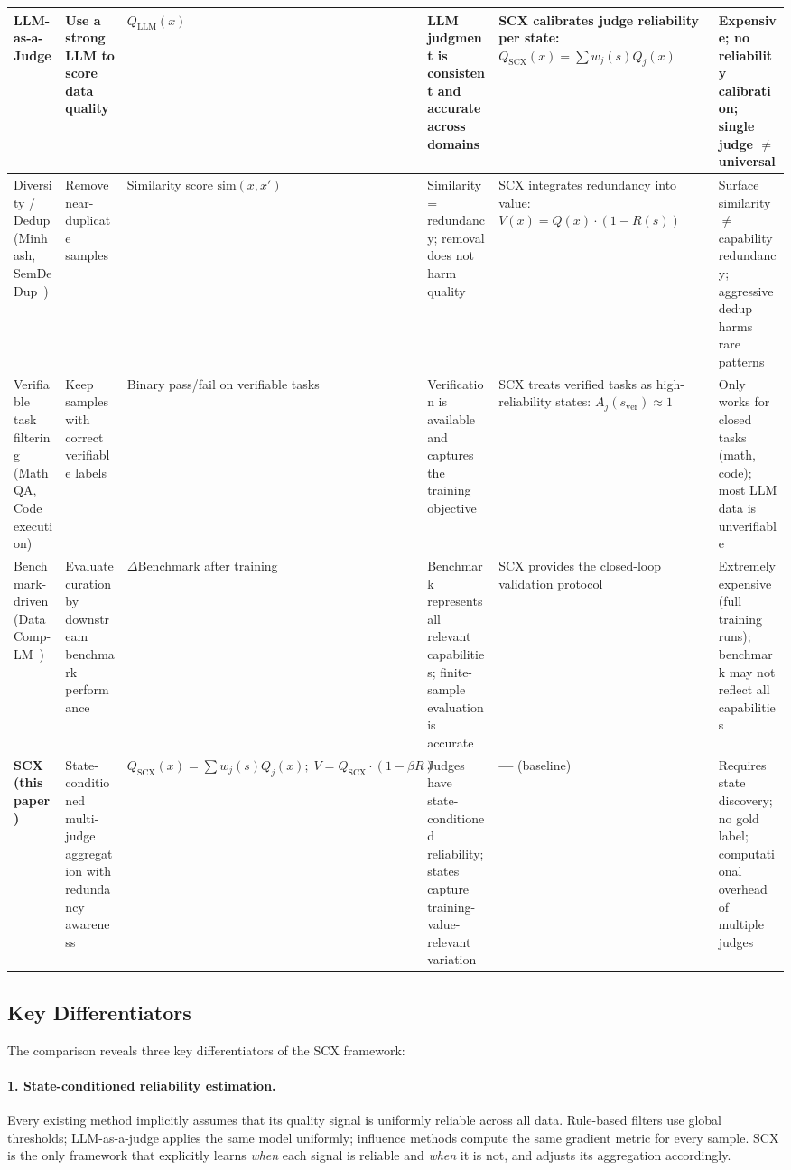 \documentclass[11pt]{article}
\begin{document}
\begin{table}[t]
{\begin{tabular}{@{}p{2.5cm}p{2.8cm}p{2.2cm}p{3.0cm}p{2.5cm}p{2.2cm}@{}}
\hline
LLM-as-a-Judge~\cite{zheng2024judging} & Use a strong LLM to score data quality & $Q_{\text{LLM}}(x)$ & LLM judgment is consistent and accurate across domains & SCX calibrates judge reliability per state: $Q_{\text{SCX}}(x) = \sum w_j(s) Q_j(x)$ & Expensive; no reliability calibration; single judge $\neq$ universal \\
\hline
Diversity / Dedup (Minhash, SemDeDup~\cite{abbas2023semdedup}) & Remove near-duplicate samples & Similarity score $\text{sim}(x, x')$ & Similarity = redundancy; removal does not harm quality & SCX integrates redundancy into value: $V(x) = Q(x) \cdot (1 - R(s))$ & Surface similarity $\neq$ capability redundancy; aggressive dedup harms rare patterns \\
\hline
Verifiable task filtering (MathQA, Code execution) & Keep samples with correct verifiable labels & Binary pass/fail on verifiable tasks & Verification is available and captures the training objective & SCX treats verified tasks as high-reliability states: $A_j(s_{\text{ver}}) \approx 1$ & Only works for closed tasks (math, code); most LLM data is unverifiable \\
\hline
Benchmark-driven (DataComp-LM~\cite{li2024dclm}) & Evaluate curation by downstream benchmark performance & $\Delta$Benchmark after training & Benchmark represents all relevant capabilities; finite-sample evaluation is accurate & SCX provides the closed-loop validation protocol & Extremely expensive (full training runs); benchmark may not reflect all capabilities \\
\hline
\textbf{SCX (this paper)} & State-conditioned multi-judge aggregation with redundancy awareness & $Q_{\text{SCX}}(x) = \sum w_j(s) Q_j(x);\; V = Q_{\text{SCX}} \cdot (1 - \beta R)$ & Judges have state-conditioned reliability; states capture training-value-relevant variation & \textbf{---} (baseline) & Requires state discovery; no gold label; computational overhead of multiple judges \\
\bottomrule
\end{tabular}
}
\end{table}

\subsection{Key Differentiators}

The comparison reveals three key differentiators of the SCX framework:

\paragraph{1. State-conditioned reliability estimation.}
Every existing method implicitly assumes that its quality signal is uniformly reliable across all data. Rule-based filters use global thresholds; LLM-as-a-judge applies the same model uniformly; influence methods compute the same gradient metric for every sample. SCX is the only framework that explicitly learns \textit{when} each signal is reliable and \textit{when} it is not, and adjusts its aggregation accordingly.
\end{document}
